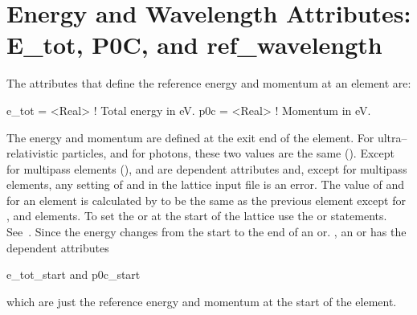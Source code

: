 \section[Energy and Wavelength Attributes]{Energy and Wavelength Attributes: E_tot, P0C, and ref_wavelength }
\label{s:energy}
The attributes that define the reference energy and momentum at an element are:
\begin{example}
  e_tot  = <Real>  ! Total energy in eV.
  p0c    = <Real>  ! Momentum in eV.
\end{example}
The energy and momentum are defined at the exit end of the element.
For ultra--relativistic particles, and for photons, these two values
are the same (). Except for multipass elements
(),  and  are dependent attributes
and, except for multipass elements, any setting of  and
 in the lattice input file is an error. The value of
 and  for an element is calculated by \bmad to be
the same as the previous element except for ,  and
 elements. To set the  or  at the start of
the lattice use the  or  statements.
See~. Since the energy changes from the start to the end
of an  or. , an  or  has
the dependent attributes
\begin{example}
  e_tot_start   and
  p0c_start
\end{example}
which are just the reference energy and momentum at the start of the element.

